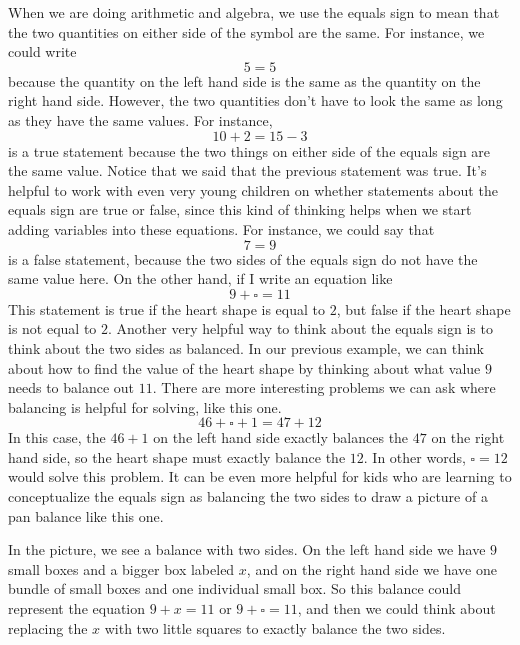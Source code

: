 \documentclass{ximera}
\begin{document}
When we are doing arithmetic and algebra, we use the equals sign to mean that the two quantities on either side of the symbol are the same. For instance, we could write
\[
5 = 5
\]
because the quantity on the left hand side is the same as the quantity on the right hand side. However, the two quantities don't have to look the same as long as they have the same values. For instance, 
\[
10 + 2 = 15 - 3
\]
is a true statement because the two things on either side of the equals sign are the same value. Notice that we said that the previous statement was true. It's helpful to work with even very young children on whether statements about the equals sign are true or false, since this kind of thinking helps when we start adding variables into these equations. For instance, we could say that 
\[
7 = 9
\]
is a false statement, because the two sides of the equals sign do not have the same value here. On the other hand, if I write an equation like
\[
9 + \square = 11
\]
This statement is true if the heart shape is equal to $2$, but false if the heart shape is not equal to $2$. Another very helpful way to think about the equals sign is to think about the two sides as balanced. In our previous example, we can think about how to find the value of the heart shape by thinking about what value $9$ needs to balance out $11$. There are more interesting problems we can ask where balancing is helpful for solving, like this one.
\[
46 + \square + 1 = 47 + 12 
\]
In this case, the $46 + 1$ on the left hand side exactly balances the $47$ on the right hand side, so the heart shape must exactly balance the $12$. In other words, $\square = 12$ would solve this problem. It can be even more helpful for kids who are learning to conceptualize the equals sign as balancing the two sides to draw a picture of a pan balance like this one.
\begin{image}
\end{image}
In the picture, we see a balance with two sides. On the left hand side we have $9$ small boxes and a bigger box labeled $x$, and on the right hand side we have one bundle of small boxes and one individual small box. So this balance could represent the equation $9 + x = 11$ or $9 + \square = 11$, and then we could think about replacing the $x$ with two little squares to exactly balance the two sides.
\end{document}
